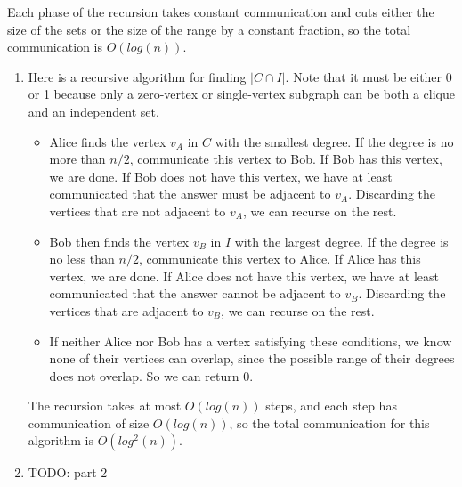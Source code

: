 \documentclass{article}
\newenvironment{problem}[2][Problem]{\begin{trivlist}
\item[\hskip \labelsep {\bfseries #1}\hskip \labelsep {\bfseries #2.}]}{\end{trivlist}}
\begin{document}
\begin{problem}{4}
  Each phase of the recursion takes constant communication and cuts
  either the size of the sets or the size of the range by a constant
  fraction, so the total communication is $O(log(n))$.
\end{problem}

\begin{problem}{5}
  \begin{enumerate}
  \item Here is a recursive algorithm for finding
    $|C \cap I|$. Note that it must be either 0 or 1 because only a
    zero-vertex or single-vertex subgraph can be both a clique and an independent
    set.

    \begin{itemize}
      \item Alice finds the vertex $v_A$ in $C$ with the smallest degree. If
        the degree is no more than $n/2$, communicate this vertex to
        Bob. If Bob has this vertex, we are done. If Bob does not have
        this vertex, we have at least communicated that the answer
        must be adjacent to $v_A$. Discarding the vertices that are not
        adjacent to $v_A$, we can recurse on the rest.
      \item Bob then finds the vertex $v_B$ in $I$ with the largest
        degree. If the degree is no less than $n/2$, communicate
        this vertex to Alice. If Alice has this vertex, we are
        done. If Alice does not have this vertex, we have at least
        communicated that the answer cannot be adjacent to
        $v_B$. Discarding the vertices that are adjacent to $v_B$,
          we can recurse on the rest.
      \item If neither Alice nor Bob has a vertex satisfying these
        conditions, we know none of their vertices can overlap, since
        the possible range of their degrees does not overlap. So we
        can return 0.
    \end{itemize}

    The recursion takes at most $O(log(n))$ steps, and each step has
    communication of size $O(log(n))$, so the total communication for
    this algorithm is $O(log^2(n))$.

    \item TODO: part 2
  \end{enumerate}

\end{problem}
  
\end{document}
